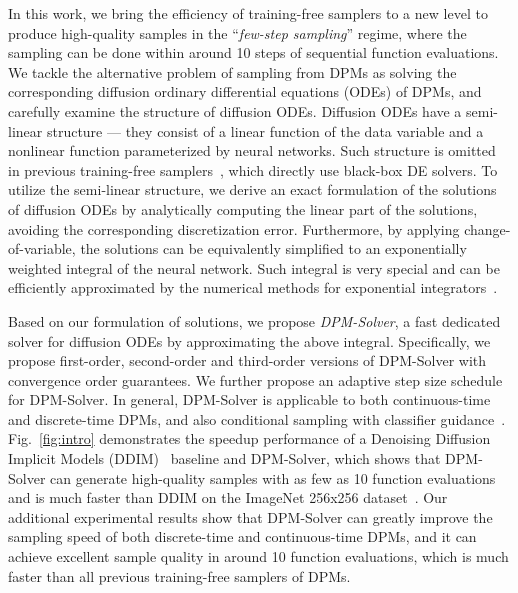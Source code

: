 In this work, we bring the efficiency of training-free samplers to a new level to produce high-quality samples in the ``\textit{few-step sampling}'' regime, where the sampling can be done within around 10 steps of sequential function evaluations. We tackle the alternative problem of sampling from DPMs as solving the corresponding diffusion ordinary differential equations (ODEs) of DPMs, and carefully examine the structure of diffusion ODEs. 
Diffusion ODEs have a semi-linear structure --- they consist of a linear function of the data variable and a  nonlinear function  parameterized by neural networks. 
Such structure is omitted in previous training-free samplers~\cite{song2020score,jolicoeur2021gotta}, which directly use black-box DE solvers. 
To utilize the semi-linear structure, we derive an exact formulation of the solutions of diffusion ODEs by analytically computing the linear part of the solutions, avoiding the corresponding discretization error. 
Furthermore, by applying change-of-variable, the solutions can be equivalently simplified to an exponentially weighted integral of the neural network. Such integral is very special and can be efficiently approximated by the numerical methods for exponential integrators~\citep{hochbruck2010exponential}. 








Based on our formulation of solutions, we propose \textit{DPM-Solver}, a fast dedicated solver for diffusion ODEs by approximating the above integral. Specifically, we propose first-order, second-order and third-order versions of DPM-Solver with convergence order guarantees.
We further propose an adaptive step size schedule for DPM-Solver.
In general, DPM-Solver is applicable to both continuous-time and discrete-time DPMs, and also conditional sampling with classifier guidance~\citep{dhariwal2021diffusion}.
Fig.~\ref{fig:intro} demonstrates the speedup performance of a Denoising Diffusion Implicit Models (DDIM)~\citep{song2020denoising} baseline and DPM-Solver, which shows that DPM-Solver can generate high-quality samples with as few as 10 function evaluations and is much faster than DDIM on the ImageNet 256x256 dataset~\citep{deng2009imagenet}. Our additional experimental results show that DPM-Solver can greatly improve the sampling speed of both discrete-time and continuous-time DPMs, and it can achieve excellent sample quality in around 10 function evaluations, which is much faster than all previous training-free samplers of DPMs.


